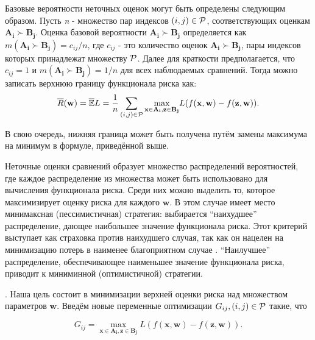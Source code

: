 \documentclass[10pt,a5paper,oneside]{article}
\begin{document}
\par
Базовые вероятности неточных оценок могут быть определены следующим образом. 
Пусть \emph{n} - множество пар индексов \((i, j)  \in \mathcal{P} \), соответствующих оценкам \(\mathbf{A_i} \succ \mathbf{B_j}\). 
Оценка базовой вероятности \(\mathbf{A_i} \succ \mathbf{B_j}\) определяется как \(m(\mathbf{A_i} \succ \mathbf{B_j}) = c_{ij} / n\), где \(c_{ij}\) - это количество оценок \(\mathbf{A_i} \succ \mathbf{B_j}\), пары индексов которых принадлежат множеству \(\mathcal{P}\). 
Далее для краткости предполагается, что \(c_{ij} = 1\) и \(m(\mathbf{A_i} \succ \mathbf{B_j}) = 1/n\) для всех наблюдаемых сравнений. 
Тогда можно записать верхнюю границу функционала риска как:
\mbox{}
\[
\overline{R}(\mathbf{w}) = \mathbb{\overline{E}}L = \frac{1}{n} \sum \limits_{(i,j) \in \Rho} \underset{%
\mathbf{x} \in \mathbf{A_i}, \mathbf{z} \in \mathbf{B_j}%
}{\operatorname{max}}%
L(f(\mathbf{x}, \mathbf{w}) - f(\mathbf{z}, \mathbf{w})).
\]

\par
В свою очередь, нижняя граница может быть получена путём замены максимума на минимум в формуле, приведённой выше. 

\par
Неточные оценки сравнений образует множество распределений вероятностей, где каждое распределение из множества может быть использовано для вычисления функционала риска.
Среди них можно выделить то, которое максимизирует оценку риска для каждого \(\mathbf{w}\). 
В этом случае имеет место минимаксная (пессимистичная) стратегия: выбирается ``наихудшее'' распределение, дающее наибольшее значение функционала риска. 
Этот критерий выступает как страховка против наихудшего случая, так как он нацелен на минимизацию потерь в наименее благоприятном случае . 
``Наилучшее'' распределение, обеспечивающее наименьшее значение функционала риска, приводит к миниминной (оптимистичной) стратегии.


\vspace*{1em}

\par
{}. 
Наша цель состоит в минимизации верхней оценки риска над множеством параметров \(\mathbf{w}\). 
Введём новые переменные оптимизации \(G_{ij}, (i, j) \in \mathcal{P}\) такие, что

\[
G_{ij} = \underset{\mathbf{x} \in \mathbf{A_i}, \mathbf{z} \in \mathbf{B_j}}{\operatorname{max}} L (f (\mathbf{x}, \mathbf{w}) - f(\mathbf{z}, \mathbf{w})). 
\]
\end{document}
